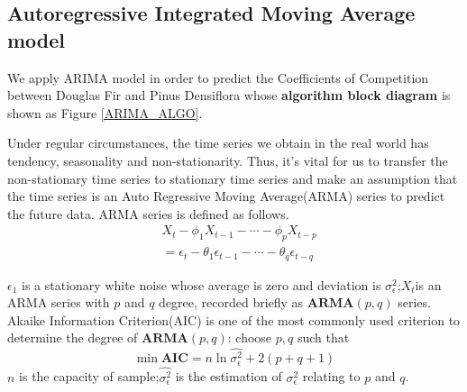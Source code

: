 \documentclass{mcmthesis}
\numberwithin{figure}{section}
\numberwithin{table}{section}
\numberwithin{equation}{section}
\begin{document}
\subsection{Autoregressive Integrated Moving Average model}

We apply ARIMA model in order to predict the Coefficients of Competition between 
Douglas Fir and Pinus Densiflora whose \textbf{algorithm block diagram} 
is shown as Figure \ref{ARIMA_ALGO}.
\par
Under regular circumstances, the time series we obtain in the real world
  has tendency, seasonality and non-stationarity. Thus, it's vital for 
  us to transfer the non-stationary time series to stationary time series
  and make an assumption that the time series is an Auto 
  Regressive Moving Average(ARMA) series to predict the 
  future data. ARMA series is defined as follows.
  \begin{align*}
    &X_t-\phi_1X_{t-1}-\cdots -\phi_pX_{t-p} \\
    &= \epsilon_t - \theta_1\epsilon_{t-1}-\cdots-\theta_q\epsilon_{t-q}
  \end{align*}
 
$ \epsilon_1 $ is a stationary white noise whose average is zero and
deviation is $ \sigma_\epsilon^2 $;$ X_t $is an ARMA series with $ p $ and $ q $
degree, recorded briefly as $ \mathbf{ARMA}(p,q) $ series.
Akaike Information Criterion(AIC) is one of the most commonly used
criterion to determine the degree of $ \mathbf{ARMA}(p,q) $: choose 
$ p,q $ such that 
\begin{equation}\label{AIC}
    \min \mathbf{AIC} = n\ln \hat{\sigma_\epsilon^2}+ 2(p+q+1)
\end{equation}
$ n $ is the capacity of sample;$ \hat{\sigma_\epsilon^2} $ is the
estimation of $ \sigma_\epsilon^2 $ relating to $ p $ and $ q $.
\end{document}

